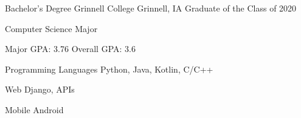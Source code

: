 \documentclass[12pt, a4paper]{awesome-cv}
\begin{document}
\begin{cventries}

\end{cventries}


\begin{cventries}
  \cventry
    {Bachelor's Degree}
    {Grinnell College}
    {Grinnell, IA}
    {Graduate of the Class of 2020}
    {
      \begin{cvitems}
        \item {Computer Science Major}
        \item {Major GPA: 3.76 \quad Overall GPA: 3.6}
      \end{cvitems}
    }
\end{cventries}


\begin{cvskills}
  \cvskill
    {Programming Languages} 
    {Python, Java, Kotlin, C/C++} 

  \cvskill
    {Web}
    {Django, APIs}

  \cvskill
    {Mobile}
    {Android}

\end{cvskills}


%
%
\end{document}
